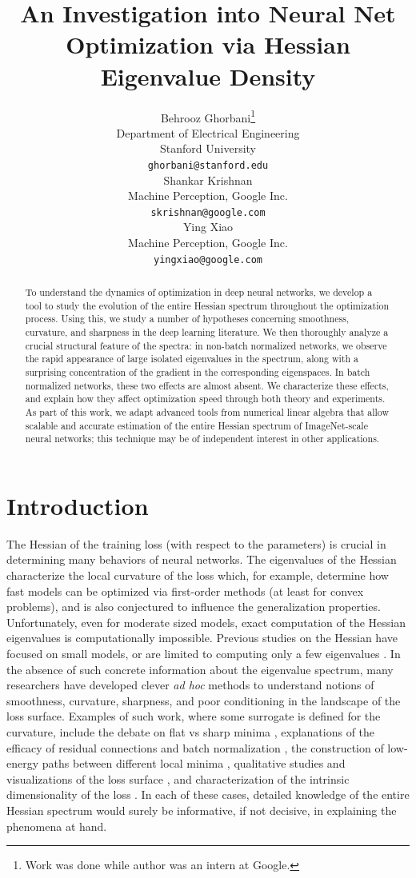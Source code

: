 \documentclass{article}
\title{An Investigation into Neural Net Optimization via Hessian Eigenvalue Density}
\author{
  Behrooz Ghorbani\thanks{Work was done while author was an intern at Google.} \\
  Department of Electrical Engineering\\
  Stanford University\\
  \texttt{ghorbani@stanford.edu} \\
  \And
  Shankar Krishnan \\
  Machine Perception, Google Inc. \\
  \texttt{skrishnan@google.com} \\
  \And
  Ying Xiao \\
  Machine Perception, Google Inc.\\
  \texttt{yingxiao@google.com} \\
}
\begin{document}
\maketitle

\begin{abstract}
To understand the dynamics of optimization in deep neural networks, we develop a tool to study the evolution of the entire Hessian spectrum throughout the optimization process. Using this, we study a number of hypotheses concerning smoothness, curvature, and sharpness in the deep learning literature. We then thoroughly analyze a crucial structural feature of the spectra: in non-batch normalized networks, we observe the rapid appearance of large isolated eigenvalues in the spectrum, along with a surprising concentration of the gradient in the corresponding eigenspaces. In batch normalized networks, these two effects are almost absent. We characterize these effects, and explain how they affect optimization speed through both theory and experiments. As part of this work, we adapt advanced tools from numerical linear algebra that allow scalable and accurate estimation of the entire Hessian spectrum of ImageNet-scale neural networks; this technique may be of independent interest in other applications.
\end{abstract}

\section{Introduction}
The Hessian of the training loss (with respect to the parameters) is crucial in determining many behaviors of neural networks. The eigenvalues of the Hessian characterize the local curvature of the loss which, for example, determine how fast models can be optimized via first-order methods (at least for convex problems), and is also conjectured to influence the generalization properties. Unfortunately, even for moderate sized models, exact computation of the Hessian eigenvalues is computationally impossible. Previous studies on the Hessian have focused on small models, or are limited to computing only a few eigenvalues \cite{sagun2016eigenvalues,sagun2017empirical,yao2018hessian}. In the absence of such concrete information about the eigenvalue spectrum, many researchers have developed clever \emph{ad hoc} methods to understand notions of smoothness, curvature, sharpness, and poor conditioning in the landscape of the loss surface. Examples of such work, where some surrogate is defined for the curvature, include the debate on flat vs sharp minima \cite{keskar2016large,dinh2017sharp,wu2017towards,jastrzkebski2017three}, explanations of the efficacy of residual connections \cite{li2018visualizing} and batch normalization \cite{santurkar2018does}, the construction of low-energy paths between  different local minima \cite{draxler2018essentially}, qualitative studies and visualizations of the loss surface \cite{goodfellow2014qualitatively}, and characterization of the intrinsic dimensionality of the loss \cite{li2018measuring}. In each of these cases, detailed knowledge of the entire Hessian spectrum would surely be informative, if not decisive, in explaining the phenomena at hand.
\end{document}
